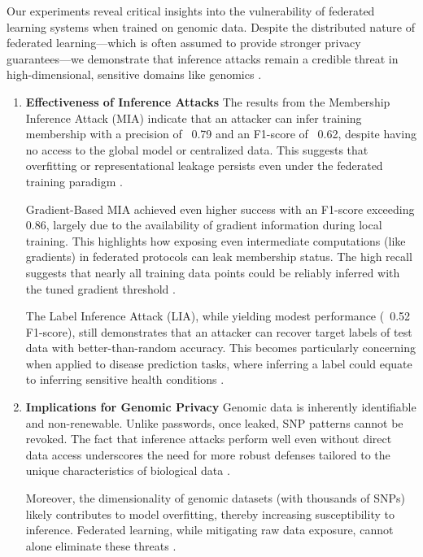 \documentclass[conference]{IEEEtran}
\begin{document}
Our experiments reveal critical insights into the vulnerability of federated learning systems when trained on genomic data. Despite the distributed nature of federated learning—which is often assumed to provide stronger privacy guarantees—we demonstrate that inference attacks remain a credible threat in high-dimensional, sensitive domains like genomics \cite{liu2023recentadvances1}\cite{federated2024learning12}.
\begin{enumerate}
    \item \textbf{Effectiveness of Inference Attacks}
    \newline
    The results from the Membership Inference Attack (MIA) indicate that an attacker can infer training membership with a precision of ~0.79 and an F1-score of ~0.62, despite having no access to the global model or centralized data. This suggests that overfitting or representational leakage persists even under the federated training paradigm \cite{Wang2023GBMIAGM37}\cite{bai2024membership42}.
    
    Gradient-Based MIA achieved even higher success with an F1-score exceeding 0.86, largely due to the availability of gradient information during local training. This highlights how exposing even intermediate computations (like gradients) in federated protocols can leak membership status. The high recall suggests that nearly all training data points could be reliably inferred with the tuned gradient threshold \cite{Wang2023GBMIAGM37}\cite{bai2024membership42}.
    
    The Label Inference Attack (LIA), while yielding modest performance (~0.52 F1-score), still demonstrates that an attacker can recover target labels of test data with better-than-random accuracy. This becomes particularly concerning when applied to disease prediction tasks, where inferring a label could equate to inferring sensitive health conditions \cite{label2022inference8}.

    \item \textbf{Implications for Genomic Privacy}
    Genomic data is inherently identifiable and non-renewable. Unlike passwords, once leaked, SNP patterns cannot be revoked. The fact that inference attacks perform well even without direct data access underscores the need for more robust defenses tailored to the unique characteristics of biological data \cite{federated2024learning12}.

    Moreover, the dimensionality of genomic datasets (with thousands of SNPs) likely contributes to model overfitting, thereby increasing susceptibility to inference. Federated learning, while mitigating raw data exposure, cannot alone eliminate these threats \cite{Yin2021comprehensive9}\cite{xu2024robust43}.


\end{enumerate}
\end{document}
